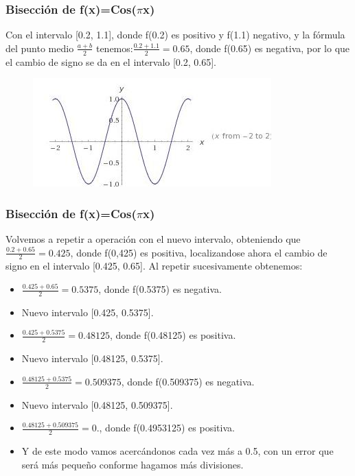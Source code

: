 \documentclass{beamer}
\begin{document}
\begin{frame}
\frametitle{Bisección de f(x)=Cos($\pi$x)}

\begin{block}{}
Con el intervalo [0.2, 1.1], donde f(0.2) es positivo y f(1.1) negativo, y la fórmula del punto medio $\frac{a+b}{2}$ tenemos:$\frac{0.2+1.1}{2}=0.65$, donde f(0.65) es negativa, por lo que el cambio de signo se da en el intervalo [0.2, 0.65].
\end{block}

\begin{figure}[b]
\begin{center}
\includegraphics[scale=0.8]{cos.jpeg}
\end{center}
\end{figure}

\end{frame}

\begin{frame}
\frametitle{Bisección de f(x)=Cos($\pi$x)}

\begin{block}{}
Volvemos a repetir a operación con el nuevo intervalo, obteniendo que $\frac{0.2+0.65}{2}=0.425$, donde f(0,425) es positiva, localizandose ahora el cambio de signo en el intervalo [0.425, 0.65]. Al repetir sucesivamente obtenemos:
\begin{itemize}

  \item $\frac{0.425+0.65}{2}=0.5375$, donde f(0.5375) es negativa.
  \pause
  \item Nuevo intervalo [0.425, 0.5375].
  \pause
  \item $\frac{0.425+0.5375}{2}=0.48125$, donde f(0.48125) es positiva.
  \pause
  \item Nuevo intervalo [0.48125, 0.5375].
  \pause
  \item $\frac{0.48125+0.5375}{2}=0.509375$, donde f(0.509375) es negativa.
  \pause
  \item Nuevo intervalo [0.48125, 0.509375].
  \pause
  \item $\frac{0.48125+0.509375}{2}=0.$, donde f(0.4953125) es positiva.
  \pause
  \item Y de este modo vamos acercándonos cada vez más a 0.5, con un error que será más pequeño conforme hagamos más divisiones.
\end{itemize}
\end{block}

\end{frame}
\end{document}
